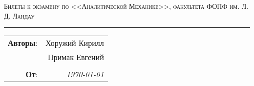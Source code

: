 
\begin{center}
    \LARGE \textsc{Билеты к экзамену по <<Аналитической Механике>>, факультета ФОПФ им. Л. Д. Ландау}
\end{center}

\hrule

\phantom{42}

\begin{flushright}
    \begin{tabular}{rr}
        \textbf{Авторы}: 
        & Хоружий Кирилл \\
        & Примак Евгений \\
        &\\
        \textbf{От}: &
        \textit{\today}\\
    \end{tabular}
\end{flushright}

\thispagestyle{empty}
\tableofcontents
\newpage
